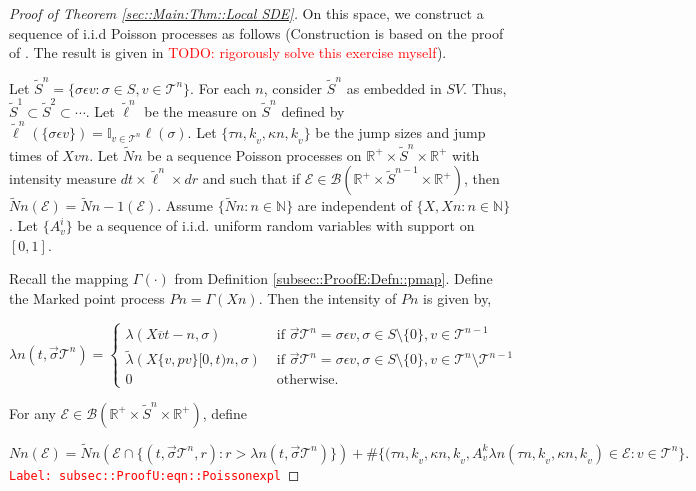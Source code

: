 \documentclass[12pt]{article}
\newcommand{\mb}{\mathbb}
\newcommand{\mc}{\mathcal}
\newcommand{\ms}{\mathscr}
\newcommand{\ov}{\overline}
\newcommand{\te}{\text}
\newcommand{\ep}{\epsilon}
\newcommand{\tr}{\textcolor{red}}
\newcommand{\labe}[1]{\tr{\texttt{Label: #1}}}
\newcommand{\ind}{\hspace{24pt}}
\renewcommand{\v}{v}							%
\renewcommand{\S}{S}							%
\newcommand{\s}{\sigma}							%
\newcommand{\sv}{\vec{\s}}						%
\newcommand{\ev}{\ep}							%
\renewcommand{\t}{t}							%
\newcommand{\X}{X}								%
\newcommand{\cl}{\ov}							%
\newcommand{\tree}{\mc{T}}						%
\newcommand{\sln}[1]{^{#1}}						%
\newcommand{\poiss}{N}							%
\newcommand{\Sm}{\ell}							%
\newcommand{\rate}{\lambda}						%
\renewcommand{\r}{r}							%
\newcommand{\alt}[1]{\widetilde{#1}}			%
\newcommand{\rt}{\tau}							%
\renewcommand{\it}{k}							%
\newcommand{\evnt}{\mc{E}}						%
\newcommand{\rv}{A}								%
\newcommand{\pmap}{\Gamma}						%
\renewcommand{\mark}{\kappa}					%
\newcommand{\rp}{P}								%
\newcommand{\crate}{\alt{\lambda}}				%
\newcommand{\p}{p}								%
\begin{document}
\begin{proof}[Proof of Theorem \ref{sec::Main:Thm::Local SDE}]
\ind On this space, we construct a sequence of i.i.d Poisson processes as follows (Construction is based on the proof of \cite[Theorem 14.7.1(b)]{DalVer08}. The result is given in \cite[Exercise 14.7.1]{DalVer08} \tr{TODO: rigorously solve this exercise myself}).

\ind Let \(\alt{\S}^n = \{\s\ev{\v}: \s\in\S,\v \in \tree\sln{n}\}\). For each \(n\), consider \(\alt{\S}^n\) as embedded in \(\S{V}\). Thus, \(\alt{\S}^1 \subset \alt{\S}^2 \subset \cdots\). Let \(\alt{\Sm}\sln{n}\) be the measure on \(\alt{\S}^n\) defined by \(\alt{\Sm}\sln{n}(\{\s\ev{\v}\}) = \mb{I}_{\v \in \tree\sln{n}}\Sm(\s)\). Let \(\{\rt{n,\it}_\v,\mark{n,\it}_{\v}\}\) be the jump sizes and jump times of \(\X{\v}{}{n}\). Let \(\alt{\poiss}{n}\) be a sequence Poisson processes on \(\mb{R}^+\times\alt{\S}^n\times \mb{R}^+\) with intensity measure \(d\t\times\alt{\Sm}^n\times d\r\) and such that if \(\evnt{} \in \ms{B}(\mb{R}^+\times\alt{\S}^{n-1}\times \mb{R}^+)\), then \(\alt{\poiss}{n}(\evnt{}) = \alt{\poiss}{n-1}(\evnt{})\). Assume \(\{\alt{\poiss}{n}:n\in\mb{N}\}\) are independent of \(\{\X{}{},\X{}{}{n}:n\in\mb{N}\}\). Let \(\{\rv_{\v}^{i}\}\) be a sequence of i.i.d. uniform random variables with support on \([0,1]\).

\ind Recall the mapping \(\pmap{}(\cdot)\) from Definition \ref{subsec::ProofE:Defn::pmap}. Define the Marked point process \(\rp{n} = \pmap{}(\X{}{}{n})\). Then the intensity of \(\rp{n}\) is given by,

\[\rate{n}(\t,\sv{\tree\sln{n}}) = \begin{cases}
\rate{}(\X{\cl{\v}}{\t-}{n},\s) &\te{ if } \sv{\tree\sln{n}} = \s\ev{\v},\s \in \S\setminus\{0\},\v\in\tree\sln{n-1}\\
\crate{}{}(\X{\{\v,\p{\v}\}}{[0,\t)}{n},\s) &\te{ if } \sv{\tree\sln{n}} = \s\ev{\v},\s\in\S\setminus\{0\},\v\in\tree\sln{n}\setminus\tree\sln{n-1}\\
0 &\te{ otherwise.}
\end{cases}\]

For any \(\evnt{} \in \ms{B}(\mb{R}^+\times\alt{\S}^n\times\mb{R}^+)\), define

\begin{equation}
\poiss{n}(\evnt{}) = \alt{\poiss}{n}\left(\evnt{}\cap\{(\t,\sv{\tree\sln{n}},\r):\r > \rate{n}(\t,\sv{\tree\sln{n}})\}\right) + \#\{(\rt{n,\it}_\v,\mark{n,\it}_\v,\rv_{\v}^{\it}\rate{n}(\rt{n,\it}_\v,\mark{n,\it}_\v) \in \evnt{}: \v\in \tree\sln{n}\}.
\label{subsec::ProofU:eqn::Poissonexpl}
\end{equation}
\labe{subsec::ProofU:eqn::Poissonexpl}


\end{proof}
\end{document}
